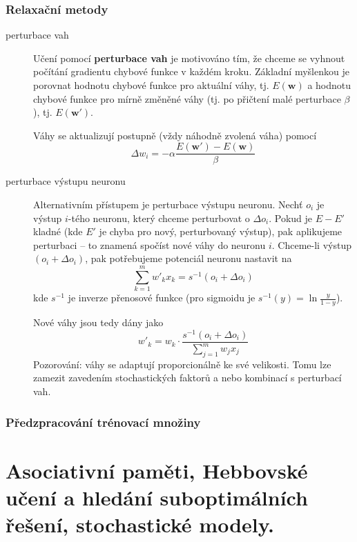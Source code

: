 \documentclass[11pt]{report} %
\renewcommand{\vec}[1]{\mathbf{#1}}
\numberwithin{equation}{section}
\begin{document}
\subsubsection{Relaxační metody}
\begin{description}
	
	
	\item[perturbace vah] Učení pomocí \textbf{perturbace vah} je motivováno tím, že chceme se vyhnout počítání gradientu chybové funkce v každém kroku. Základní myšlenkou je porovnat hodnotu chybové funkce pro aktuální váhy, tj. $E(\vec{w})$ a hodnotu chybové funkce pro mírně změněné váhy (tj. po přičtení malé perturbace $\beta$), tj. $E(\vec{w'})$.
	
	Váhy se aktualizují postupně (vždy náhodně zvolená váha) pomocí
	$$\Delta w_i = - \alpha \frac{E(\vec{w'}) - E(\vec{w})}{\beta}$$ 
	
	\item[perturbace výstupu neuronu] 
	Alternativním přístupem je perturbace výstupu neuronu. Nechť $o_i$ je výstup $i$-tého neuronu, který chceme perturbovat o $\Delta o_i$. Pokud je $E - E'$ kladné (kde $E'$ je chyba pro nový, perturbovaný výstup), pak aplikujeme perturbaci -- to znamená spočíst nové váhy do neuronu $i$. Chceme-li výstup $(o_i + \Delta o_i)$, pak potřebujeme potenciál neuronu nastavit na 
	$$\sum\limits_{k=1}^{m} w'_k x_k = s^{-1}(o_i + \Delta o_i)$$
	kde $s^{-1}$ je inverze přenosové funkce (pro sigmoidu je $s^{-1}(y) = \ln \frac{y}{1-y}$).
	
	Nové váhy jsou tedy dány jako 
	$$
	w'_k = w_k \cdot \frac{s^{-1}(o_i + \Delta o_i)}{\sum\limits_{j=1}^{m} w_j x_j}
	$$
	Pozorování: váhy se adaptují proporcionálně ke své velikosti. Tomu lze zamezit zavedením stochastických faktorů a nebo kombinací s perturbací vah.
	
\end{description}






\subsubsection{Předzpracování trénovací množiny}








\section{Asociativní paměti, Hebbovské učení a hledání suboptimálních řešení, stochastické modely.}
\end{document}
